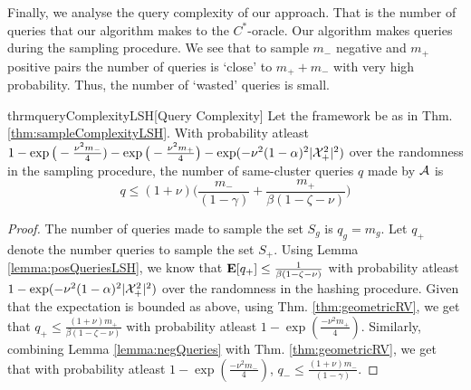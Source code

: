 Finally, we analyse the query complexity of our approach. That is the number of queries that our algorithm makes to the $C^*$-oracle. Our algorithm makes queries during the sampling procedure. We see that to sample $m_-$ negative and $m_+$ positive pairs the number of queries is `close' to $m_+ + m_-$ with very high probability. Thus, the number of `wasted' queries is small.  

\begin{restatable}{thrm}{queryComplexityLSH}[Query Complexity]
\label{thm:queryComplexity}
Let the framework be as in Thm. \ref{thm:sampleComplexityLSH}. With probability atleast $1-\exp\big(-\frac{\nu^2m_-}{4}) - \exp\big(-\frac{\nu^2m_+}{4}\big) - \exp(-\nu^2(1-\alpha)^2|\mathcal X_+^2|^2)$ over the randomness in the sampling procedure, the number of same-cluster queries $q$ made by $\mathcal A$ is  
$$q \le (1+\nu)\bigg(\frac{m_-}{(1-\gamma)} + \frac{m_+}{\beta(1-\zeta-\nu)}\bigg)$$
\end{restatable}

\begin{proof}
The number of queries made to sample the set $S_g$ is $q_g = m_g$. Let $q_+$ denote the number queries to sample the set $S_+$. Using Lemma \ref{lemma:posQueriesLSH}, we know that $\mathbf E[q_+] \le \frac{1}{\beta(1-\zeta-\nu)}$ with probability atleast $1-\exp(-\nu^2(1-\alpha)^2|\mathcal X_+^2|^2)$ over the randomness in the hashing procedure. Given that the expectation is bounded as above, using Thm. \ref{thm:geometricRV}, we get that $q_+ \le \frac{(1+\nu)m_+}{\beta(1-\zeta-\nu)}$ with probability atleast $1-\exp(\frac{-\nu^2m_+}{4})$. Similarly, combining Lemma \ref{lemma:negQueries} with Thm. \ref{thm:geometricRV}, we get that with probability atleast $1-\exp(\frac{-\nu^2m_-}{4})$, $q_- \le \frac{(1+\nu)m_-}{(1-\gamma)}$.
\end{proof}